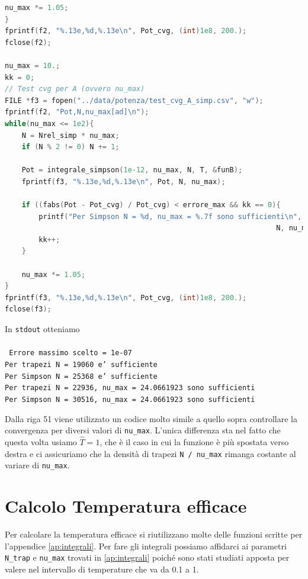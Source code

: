 \documentclass[a4paper, titlepage]{article}
\begin{document}
\begin{lstlisting}[language=C]
    nu_max *= 1.05;
}
fprintf(f2, "%.13e,%d,%.13e\n", Pot_cvg, (int)1e8, 200.);
fclose(f2);

nu_max = 10.;
kk = 0;
// Test cvg per A (ovvero nu_max)
FILE *f3 = fopen("../data/potenza/test_cvg_A_simp.csv", "w");
fprintf(f2, "Pot,N,nu_max[ad]\n");
while(nu_max <= 1e2){
    N = Nrel_simp * nu_max;
    if (N % 2 != 0) N += 1;

    Pot = integrale_simpson(1e-12, nu_max, N, T, &funB);
    fprintf(f3, "%.13e,%d,%.13e\n", Pot, N, nu_max);

    if ((fabs(Pot - Pot_cvg) / Pot_cvg) < errore_max && kk == 0){
        printf("Per Simpson N = %d, nu_max = %.7f sono sufficienti\n",
                                                                N, nu_max);
        kk++;
    }

    nu_max *= 1.05;
}
fprintf(f3, "%.13e,%d,%.13e\n", Pot_cvg, (int)1e8, 200.);
fclose(f3);
\end{lstlisting}

In \texttt{stdout} otteniamo \\ \\
\texttt{
Errore massimo scelto = 1e-07 \\
Per trapezi N = 19060 e' sufficiente \\
Per Simpson N = 25368 e' sufficiente \\
Per trapezi N = 22936, nu\_max = 24.0661923 sono sufficienti \\
Per Simpson N = 30516, nu\_max = 24.0661923 sono sufficienti \\
}

Dalla riga 51 viene utilizzato un codice molto simile a quello sopra controllare
la convergenza per diversi valori di \texttt{nu\_max}.
L'unica differenza sta nel fatto che questa volta usiamo $\hat T = 1$, che è il
caso in cui la funzione è più spostata verso destra e ci assicuriamo che
la densità di trapezi \texttt{N / nu\_max} rimanga costante al variare di
\texttt{nu\_max}.


\section{Calcolo Temperatura efficace} \label{ap:Teff}

Per calcolare la temperatura efficace si riutilizzano molte delle funzioni
scritte per l'appendice \ref{ap:integrali}.
Per fare gli integrali possiamo affidarci ai parametri \texttt{N\_trap} e
\texttt{nu\_max} trovati in \ref{ap:integrali} poiché sono stati studiati
apposta per valere nel intervallo di temperature che va da 0.1 a 1.
\end{document}
